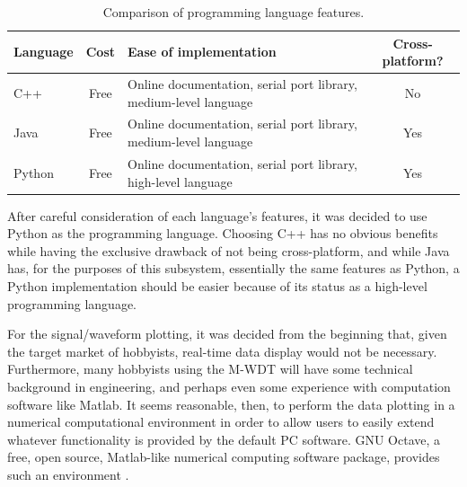 \begin{table}[bhp]
\begin{tabular}{l | c | p{6cm} | c}
	Language & Cost & Ease of implementation & Cross-platform? \\ 
	\hline
	C++ & Free & Online documentation, serial port library, medium-level language \cite{web:cpptut}\cite{web:cppserial} & No \\ 
	\hline
	Java & Free & Online documentation, serial port library, medium-level language \cite{web:javaapi}\cite{web:javaserial} & Yes \\
	\hline
	Python & Free & Online documentation, serial port library, high-level language \cite{web:pydoc}\cite{web:pyserial} & Yes \\
\end{tabular}
\caption[Language features]{Comparison of programming language features.}
\label{tab:languages features}
\end{table}


After careful consideration of each language's features, it was decided to use Python as 
the programming language. Choosing C++ has no obvious benefits while having the exclusive 
drawback of not being cross-platform, and while Java has, for the purposes of this subsystem, 
essentially the same features as Python, a Python implementation should be easier because of 
its status as a high-level programming language.

For the signal/waveform plotting, it was decided from the beginning that, given the target 
market of hobbyists, real-time data display would not be necessary. Furthermore, many 
hobbyists using the M-WDT will have some technical background in engineering, 
and perhaps even some experience with computation software like Matlab. It seems reasonable, 
then, to perform the data plotting in a numerical computational environment in order to 
allow users to easily extend whatever functionality is provided by the default PC software. 
GNU Octave, a free, open source, Matlab-like numerical computing software package, provides 
such an environment \cite{web:octave}.


